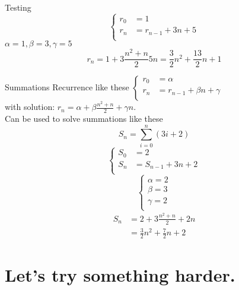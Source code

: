 \documentclass[mode=geye]{elegantnote}
\begin{document}
Testing
\begin{equation*}
    \left\{
        \begin{array}{ll}
            r_0 &= 1\\
            r_n &= r_{n-1}+3 n+5\\
        \end{array}
    \right.
\end{equation*}
$ \alpha = 1, \beta = 3, \gamma = 5 $ 
\begin{equation*}
    r_n = 1+3 \frac{n^2+n}{2}5n = \frac{3}{2}n^2+\frac{13}{2}n+1
\end{equation*}

Summations
Recurrence like these $ \left\{
    \begin{array}{ll}
        r_0 &= \alpha \\
        r_n &= r_{n-1}+\beta n+\gamma \\
    \end{array}
\right. $ \\
with solution: $ r_n = \alpha + \beta \frac{n^2+n}{2}+ \gamma n $. \\
Can be used to solve summations like these 
\begin{equation*}
    S_n = \sum_{i=0}^{n}(3i+2)
\end{equation*}
\begin{equation*}
    \left\{
        \begin{array}{ll}
            S_0 &= 2 \\
            S_n &= S_{n-1}+3n+2 \\
        \end{array}
    \right.
\end{equation*}
\begin{equation*}
    \left\{
        \begin{array}{l}
            \alpha = 2\\
            \beta=3\\
            \gamma=2\\
        \end{array}
    \right.
\end{equation*}
\begin{align*}
    S_n &= 2+3\frac{n^2+n}{2}+2n\\
        &= \frac{3}{2}n^2+\frac{7}{2}n+2
\end{align*}

\section{Let's try something harder.}
\end{document}
